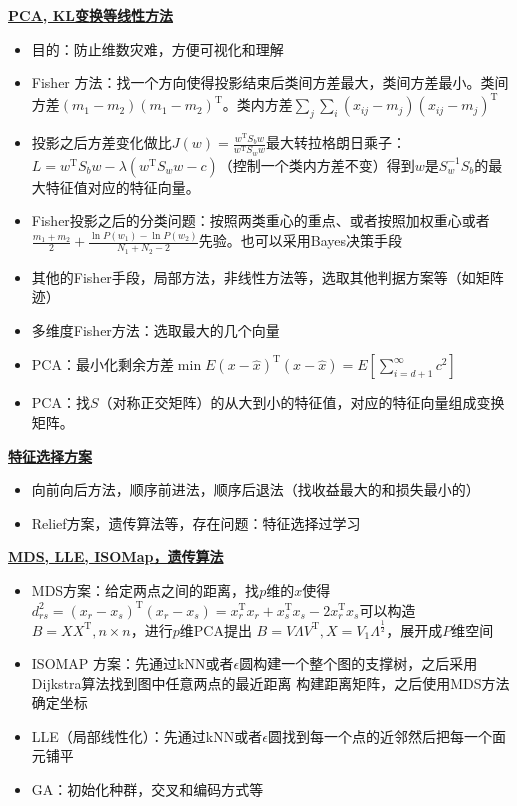 \documentclass[UTF8,a4paper,landscape,compress]{paper}
\renewcommand{\subsection}[1]{{\small\textbf{\underline{#1}}}\\ }
\newcommand{\List}[1]{\begin{itemize}[fullwidth,itemindent=0em] #1 \end{itemize}}
\begin{document}
\begin{multicols}{4}
\subsection{PCA, KL变换等线性方法}
\List{
    \item {目的：防止维数灾难，方便可视化和理解}
    \item {Fisher 方法：找一个方向使得投影结束后类间方差最大，类间方差最小。类间方差$(m_1 - m_2)(m_1 - m_2)^{\mathrm T}$。类内方差$\sum_j \sum_i (x_{ij} - m_j)(x_{ij} - m_j)^{\mathrm T}$}
    \item {投影之后方差变化做比$J(w) = \frac{w^{\mathrm T} S_bw}{w^{\mathrm T} S_ww}$最大转拉格朗日乘子：$L = w^{\mathrm T} S_bw - \lambda(w^{\mathrm T} S_ww-c)$（控制一个类内方差不变）得到$w$是$S_w^{-1}S_b$的最大特征值对应的特征向量。}
    \item {Fisher投影之后的分类问题：按照两类重心的重点、或者按照加权重心或者$\frac{m_1 + m_2}2 + \frac{\ln P(w_1) - \ln P(w_2)}{N_1 + N_2 - 2}$先验。也可以采用Bayes决策手段}
    \item {其他的Fisher手段，局部方法，非线性方法等，选取其他判据方案等（如矩阵迹）}
    \item {多维度Fisher方法：选取最大的几个向量}
    \item {PCA：最小化剩余方差$\min E(x - \hat x)^{\mathrm T}(x - \hat x) = E[\sum_{i=d+1}^\infty c^2]$}
    \item {PCA：找$S$（对称正交矩阵）的从大到小的特征值，对应的特征向量组成变换矩阵。}
}
\subsection{特征选择方案}
\List{
    \item {向前向后方法，顺序前进法，顺序后退法（找收益最大的和损失最小的）}
    \item {Relief方案，遗传算法等，存在问题：特征选择过学习}
}
\subsection{MDS, LLE, ISOMap，遗传算法}
\List{
    \item {MDS方案：给定两点之间的距离，找$p$维的$x$使得$d_{rs}^2 = (x_r - x_s)^{\mathrm T}(x_r - x_s) = x_r^{\mathrm T}x_r + x_s^{\mathrm T}x_s -2 x_r^{\mathrm T}x_s$可以构造$B = XX^{\mathrm T}, n \times n$，进行$p$维PCA提出 $B = V\Lambda V^{\mathrm T}, X = V_1\Lambda^{\frac12}$，展开成$P$维空间}
    \item {ISOMAP 方案：先通过kNN或者$\epsilon$圆构建一个整个图的支撑树，之后采用Dijkstra算法找到图中任意两点的最近距离
    构建距离矩阵，之后使用MDS方法确定坐标}
    \item {LLE（局部线性化）：先通过kNN或者$\epsilon$圆找到每一个点的近邻然后把每一个面元铺平}
    \item {GA：初始化种群，交叉和编码方式等}
}

\end{multicols}
\end{document}
